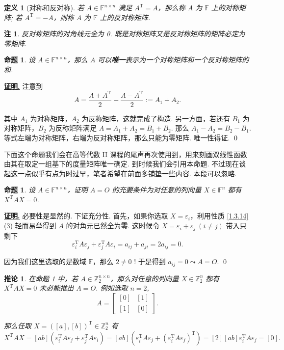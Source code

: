 \documentclass[10pt,openany]{article}
\theoremstyle{thmstyle} %
\theoremstyle{defstyle} %
\newtheorem{definition}[theorem]{定义}
\newtheorem{corollary}[theorem]{推论}
\theoremstyle{prostyle} %
\newtheorem{proposition}[theorem]{命题}
\theoremstyle{exastyle}
\theoremstyle{remstyle}
\newtheorem{remark}[theorem]{注}
\renewenvironment{proof}[1][证明]{\par\underline{\textbf{#1.}} \;\fangsong}{\qed\par}
\newcommand{\T}{^{\text{T}}}
\newcommand{\F}{\mathbb{F}}
\newcommand{\n}{^{n \times n}}
\begin{document}
\begin{definition}[对称和反对称]
	若 \( A \in \F^{n \times n} \) 满足 \( A\T=A \)，那么称 \( A \) 为 \( \F \) 上的对称矩阵; 若 \( A\T=-A \)，则称 \( A \) 为 \( \F \) 上的反对称矩阵.
\end{definition}

\begin{remark}
	反对称矩阵的对角线元全为 0. 既是对称矩阵又是反对称矩阵的矩阵必定为零矩阵.
\end{remark}

\begin{proposition}	\label{1.3.26}
	设 \( A \in \F^{n \times n} \)，那么 \( A \) 可以\textbf{唯一}表示为一个对称矩阵和一个反对称矩阵的和.

\end{proposition}

\begin{proof}
	注意到
	\[ A=\frac{A+A\T}{2}+\frac{A-A\T}{2}:=A_1+A_2. \]
	
	其中 \( A_1 \) 为对称矩阵，\( A_2 \) 为反称矩阵，这就完成了构造. 另一方面，若还有 \( B_1 \) 为对称矩阵，\( B_2 \) 为反称矩阵满足 \( A=A_1+A_2=B_1+B_2 \). 那么 \( A_1-A_2=B_2-B_1 \). 等式左端为对称矩阵，右端为反对称矩阵，那么只能为零矩阵. 唯一性得证.
\end{proof}



下面这个命题我们会在高等代数 II 课程的尾声再次使用到，用来刻画双线性函数由其在取定一组基下的度量矩阵唯一确定. 到时候我们会引用本命题. 不过现在谈起这一点似乎有点为时过早，笔者希望在前面多铺垫一些内容. 本段可以忽略.

\begin{proposition}	\label{1.3.27}
	设 \( A \in \F\n \)，证明 \( A=O \) 的充要条件为对任意的列向量 \( X \in \F^n\) 都有 \( X\T AX=0 \).

\end{proposition} 

\begin{proof}
	必要性是显然的. 下证充分性. 首先，如果你选取 \( X=\varepsilon_i \)，利用性质 \ref{1.3.14} (3) 轻而易举得到 \( A \) 的对角元已然全为零. 这时候令 \( X=\varepsilon_i+\varepsilon_j \ (i \neq j) \) 带入只剩下 
	\[ \varepsilon_i\T A \varepsilon_j+\varepsilon_j\T A \varepsilon_i= a_{ij}+a_{ji}=2a_{ij}=0. \]
	
	因为我们这里选取的是数域 \( \mathbb{F} \)，那么 \( 2 \neq 0 \) ! 于是得到 \( a_{ij}=0 \leadsto A=O \).
\end{proof}

\begin{corollary}
	在命题 \ref{1.3.27} 中，若 \( A \in \mathbb{Z}_2^{n \times n} \)，那么对任意的列向量 \( X \in \mathbb{Z}_2^n\) 都有 \( X\T AX=0 \) 未必能推出 \( A=O \). 例如选取 \( n=2 \),
	\[ A=\begin{bmatrix}
		[0] & [1] \\ [1] & [0]
	\end{bmatrix}. \]
	
	那么任取 \( X=([a],[b])\T \in \mathbb{Z}_2^n \) 有
	\[ X\T AX=[ab](\varepsilon_i\T A \varepsilon_j+\varepsilon_j\T A \varepsilon_i)=[ab](\varepsilon_i\T A \varepsilon_j+(\varepsilon_i\T A \varepsilon_j)\T)=[2][ab]\varepsilon_i\T A \varepsilon_j=[0]. \]
\end{corollary}
\end{document}
